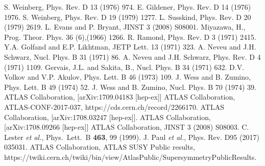 \documentclass[UKenglish,10pt]{article}
\begin{document}
\begin{thebibliography}{99}
   S. Weinberg, Phys. Rev. D 13 (1976) 974.
   E. Gildener, Phys. Rev. D 14 (1976) 1976.
   S. Weinberg, Phys. Rev. D 19 (1979) 1277.
   L. Susskind, Phys. Rev. D 20 (1979) 2619.
   L. Evans and P. Bryant, JINST 3 (2008) S08001.
   Miyazawa, H., Prog. Theor. Phys. 36 (6),(1966) 1266.
   R. Ramond, Phys. Rev. D 3 (1971) 2415.
   Y.A. Golfand and E.P. Likhtman, JETP Lett. 13 (1971) 323.
   A. Neveu and J.H. Schwarz, Nucl. Phys. B 31 (1971) 86.
   A. Neveu and J.H. Schwarz, Phys. Rev. D 4 (1971) 1109.
   Gervais, J.L. and Sakita, B., Nucl. Phys. B 34 (1971) 632.
   D.V. Volkov and V.P. Akulov, Phys. Lett. B 46 (1973) 109.
   J. Wess and B. Zumino, Phys. Lett. B 49 (1974) 52.
   J. Wess and B. Zumino, Nucl. Phys. B 70 (1974) 39.
  ATLAS Collaboration, [arXiv:1709.04183 [hep-ex]]
  ATLAS Collaboration, ATLAS-CONF-2017-037, https://cds.cern.ch/record/2266170.
  ATLAS Collaboration, [arXiv:1708.03247 [hep-ex]].
  ATLAS Collaboration, [arXiv:1708.09266 [hep-ex]]
  ATLAS Collaboration, JINST 3 (2008) S08003.
   C. Lester {\it et al.}, Phys.\ Lett.\ B {\bf 463}, 99 (1999).
   J. Paul {\it et al.}, Phys. Rev. D95 (2017) 035031.
  ATLAS Collaboration, ATLAS SUSY Public results, \\
  https://twiki.cern.ch/twiki/bin/view/AtlasPublic/SupersymmetryPublicResults.
\end{thebibliography}

\end{document}
